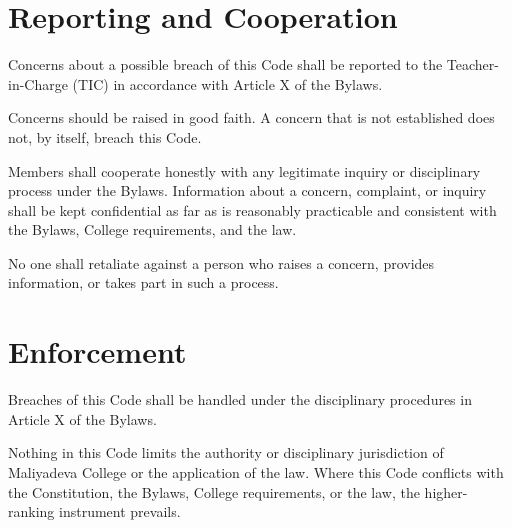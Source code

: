 \documentclass[a4paper]{article}
\begin{document}
\section{Reporting and Cooperation}

Concerns about a possible breach of this Code shall be reported to the
Teacher-in-Charge (TIC) in accordance with Article X of the Bylaws.

Concerns should be raised in good faith. A concern that is not
established does not, by itself, breach this Code.

Members shall cooperate honestly with any legitimate inquiry or
disciplinary process under the Bylaws. Information about a concern,
complaint, or inquiry shall be kept confidential as far as is reasonably
practicable and consistent with the Bylaws, College requirements, and the
law.

No one shall retaliate against a person who raises a concern, provides
information, or takes part in such a process.

\section{Enforcement}

Breaches of this Code shall be handled under the disciplinary procedures
in Article X of the Bylaws.

Nothing in this Code limits the authority or disciplinary jurisdiction of
Maliyadeva College or the application of the law. Where this Code
conflicts with the Constitution, the Bylaws, College requirements, or the
law, the higher-ranking instrument prevails.
\end{document}
